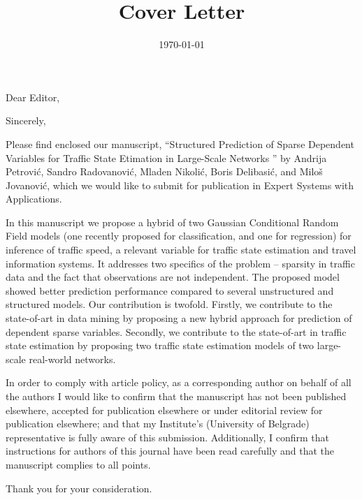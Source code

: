 \documentclass[11pt,a4paper,roman]{moderncv} %
\title{Cover Letter}
\begin{document}





\clearpage


\date{\today} %
\opening{Dear Editor,} %
\closing{Sincerely,} %

\makelettertitle %


Please find enclosed our manuscript, “Structured Prediction of Sparse Dependent Variables for Traffic State Etimation in Large-Scale Networks ” by Andrija Petrovi\'c, Sandro Radovanovi\'c, Mladen Nikoli\'c, Boris Delibasi\'c, and Milo\v s Jovanovi\'c, which we would like to submit for publication in Expert Systems with Applications.


In this manuscript we propose a hybrid of two Gaussian Conditional Random Field models (one recently proposed for classification, and one for regression) for inference of traffic speed, a relevant variable for traffic state estimation and travel information systems. It addresses two specifics of the problem -- sparsity in traffic data and the fact that observations are not independent. The proposed model showed better prediction performance compared to several unstructured and structured models.
Our contribution is twofold. Firstly, we contribute to the state-of-art in data mining by proposing a new hybrid approach for prediction of dependent sparse variables. Secondly, we contribute to the state-of-art in traffic state estimation by proposing two traffic state estimation models of two large-scale real-world networks.

In order to comply with article policy, as a corresponding author on behalf of all the authors I would like to confirm that the manuscript has not been published elsewhere, accepted for publication elsewhere or under editorial review for publication elsewhere; and that my Institute's (University of Belgrade) representative is fully aware of this submission. Additionally, I confirm that instructions for authors of this journal have been read carefully and that the manuscript complies to all points.


Thank you for your consideration.

\vspace{10mm}

\makeletterclosing %

\end{document}

